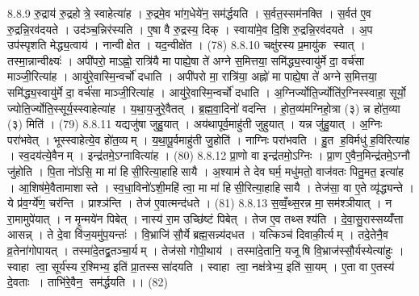 8.8.9
रु॒द्राय॑ रु॒द्रहोत्रे॒ स्वाहेत्या॑ह । रु॒द्रमे॒व भा॑ग॒धेये॑न॒ सम॑र्द्धयति । स॒र्वत॒स्सम॑नक्ति । स॒र्वत॑ ए॒व रु॒द्रन्नि॒रव॑दयते । उद॑ञ्च॒न्निर॑स्यति । ए॒षा वै रु॒द्रस्य॒ दिक् । स्वाया॑मे॒व दि॒शि रु॒द्रन्नि॒रव॑दयते । अ॒प उप॑स्पृशति मेद्ध्य॒त्वाय॑ । नान्वीक्षेत । यद॒न्वीक्षे॑त । (78)
8.8.10
चक्षु॑रस्य प्र॒मायु॑क स्यात् । तस्मा॒न्नान्वीक्ष्यः॑ । अपी॑परो॒ माऽह्नो॒ रात्रि॑यै मा पाह्ये॒षा ते॑ अग्ने स॒मित्तया॒ समि॑द्ध्य॒स्वायु॑र्मे दा॒ वर्च॑सा माञ्जी॒रित्या॑ह । आयु॑रे॒वास्मि॒न्वर्चो॑ दधाति । अपी॑परो मा॒ रात्रि॑या॒ अह्नो॑ मा पाह्ये॒षा ते॑ अग्ने स॒मित्तया॒ समि॑द्ध्य॒स्वायु॑र्मे दा॒ वर्च॑सा माञ्जी॒रित्या॑ह । आयु॑रे॒वास्मि॒न्वर्चो॑ दधाति । अ॒ग्निर्ज्योति॒र्ज्योति॑र॒ग्निस्स्वाहा॒ सूर्यो॒ ज्योति॒र्ज्योति॒स्सूर्य॒स्स्वाहेत्या॑ह । य॒था॒य॒जुरे॒वैतत् । ब्र॒ह्म॒वा॒दिनो॑ वदन्ति । हो॒त॒व्य॑मग्निहो॒त्रा (३) न्न हो॑त॒व्या (३) मिति॑ । (79)
8.8.11
यद्यजु॑षा जुहु॒यात् । अय॑थापूर्व॒माहु॑ती जुहुयात् । यन्न जु॑हु॒यात् । अ॒ग्निः परा॑भवेत् । भूस्स्वाहेत्ये॒व हो॑त॒व्यम् । य॒था॒पू॒र्वमाहु॑ती जु॒होति॑ । नाग्निः परा॑भवति । हु॒त ह॒विर्मधु॑ ह॒विरित्या॑ह । स्व॒दय॑त्ये॒वैनम् । इन्द्र॑तमे॒ऽग्नावित्या॑ह । (80)
8.8.12
प्रा॒णो वा इन्द्र॑तमो॒ऽग्निः । प्रा॒ण ए॒वैन॒मिन्द्र॑तमे॒ऽग्नौ जु॑होति । पि॒ता नो॑ऽसि॒ मा मा॑ हिसी॒रित्या॒हाहिसायै । अ॒श्याम॑ ते देव घर्म॒ मधु॑मतो॒ वाज॑वतः पितु॒मत॒ इत्या॑ह । आ॒शिष॑मे॒वैतामाशास्ते । स्व॒धा॒विनो॑ऽशी॒महि॑ त्वा॒ मा मा॑ हिसी॒रित्या॒हाहिसायै । तेज॑सा॒ वा ए॒ते व्यृ॑द्ध्यन्ते । ये प्र॑व॒र्ग्ये॑ण॒ चर॑न्ति । प्राश्ञ॑न्ति । तेज॑ ए॒वात्मन्द॑धते । (81)
8.8.13
स॒व्वँ॒थ्स॒रन्न मा॒सम॑श्ञीयात् । न रा॒मामुपे॑यात् । न मृ॒न्मये॑न पिबेत् । नास्य॑ रा॒म उच्छि॑ष्टं पिबेत् । तेज ए॒व तथ्सश्य॑ति । दे॒वा॒सु॒रास्सय्यँ॑त्ता आसन्न् । ते दे॒वा वि॑ज॒यमु॑प॒यन्तः॑ । वि॒भ्राजि॑ सौ॒र्ये ब्रह्म॒सन्न्य॑दधत । यत्किञ्च॑ दिवाकी॒र्त्यम् । तदे॒तेनै॒व व्र॒तेना॑गोपायत् । तस्मा॑दे॒तद्व्र॒तञ्चा॒र्यम् । तेज॑सो गोपी॒थाय॑ । तस्मा॑दे॒तानि॒ यजूषि वि॒भ्राज॑स्सौ॒र्यस्येत्या॑हुः । स्वाहा त्वा॒ सूर्य॑स्य र॒श्मिभ्य॒ इति॑ प्रा॒तस्ससा॑दयति । स्वाहा त्वा॒ नक्ष॑त्रेभ्य॒ इति॑ सा॒यम् । ए॒ता वा ए॒तस्य॑ दे॒वताः । ताभि॑रे॒वैन॒ सम॑र्द्धयति ।। (82)
\anuvakamend

